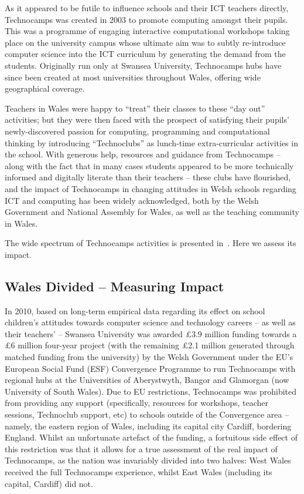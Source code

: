 \documentclass{sig-alternate}
\begin{document}
As it appeared to be futile to influence schools and their ICT
teachers directly, Technocamps was created in 2003 to promote
computing amongst their pupils.  This was a programme of engaging
interactive computational workshops taking place on the university
campus whose ultimate aim was to subtly re-introduce computer science
into the ICT curriculum by generating the demand from the students.
Originally run only at Swansea University, Technocamps hubs have since
been created at most universities throughout Wales, offering wide
geographical coverage.

Teachers in Wales were happy to ``treat'' their classes to these ``day
out'' activities; but they were then faced with the prospect of
satisfying their pupils' newly-discovered passion for computing,
programming and computational thinking by introducing ``Technoclubs''
as lunch-time extra-curricular activities in the school.  With
generous help, resources and guidance from Technocamps -- along with
the fact that in many cases students appeared to be more technically
informed and digitally literate than their
teachers -- these clubs have
flourished, and the impact of Technocamps in changing attitudes in
Welsh schools regarding ICT and computing has been widely
acknowledged, both by the Welsh Government and National Assembly for
Wales, as well as the teaching community in Wales.

The wide spectrum of Technocamps activities is presented
in~\cite{crick+moller-wipsce2015}.
Here we assess its impact.

\subsection{Wales Divided -- Measuring Impact}\label{walesdivided}

In 2010, based on long-term empirical data regarding its effect on
school children's attitudes towards computer science and technology
careers -- as well as their teachers' -- Swansea University was
awarded \pounds 3.9 million funding towards a \pounds 6 million
four-year project (with the remaining \pounds 2.1 million generated
through matched funding from the university) by the Welsh Government
under the EU's European Social Fund (ESF) Convergence
Programme
to run Technocamps with regional hubs at the
Universities of Aberystwyth, Bangor and Glamorgan (now University of
South Wales).
Due to EU restrictions, Technocamps was
prohibited from providing any support (specifically, resources for
workshops, teacher sessions, Technoclub support, etc) to schools
outside of the Convergence area -- namely, the eastern region of
Wales, including its capital city Cardiff, bordering England.
Whilst an unfortunate artefact of the
funding, a fortuitous side effect of this restriction was that it
allows for a true assessment of the real impact of Technocamps, as the
nation was invariably divided into two halves: West Wales
received the full Technocamps experience, whilst East Wales
(including its capital, Cardiff) did not. %
\end{document}
